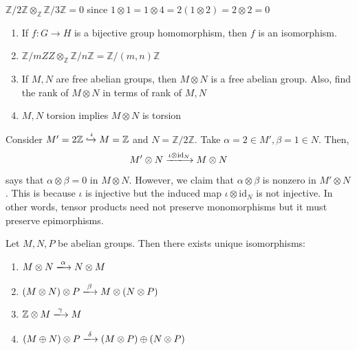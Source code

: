 \documentclass[oneside, 12pt]{scrbook}
\newcommand{\ZZ}{\mathbb Z}
\theoremstyle{theorem}
\begin{document}
\begin{example}
$\ZZ/2\ZZ \otimes_{\ZZ} \ZZ / 3\ZZ = 0$ since $1 \otimes 1 = 1 \otimes 4 = 2(1 \otimes 2) = 2 \otimes 2 = 0$
\end{example}

\begin{exercise}
\begin{enumerate}
\item If $f : G \rightarrow H$ is a bijective group homomorphism, then $f$ is an isomorphism. 

\item $\ZZ / m ZZ \otimes_{\ZZ} \ZZ / n \ZZ = \ZZ / (m,n) \ZZ$
\item If $M,N$ are free abelian groups, then $M \otimes N$ is a free abelian group. Also, find the rank of $M \otimes N$ in terms of rank of $M,N$
\item $M,N$ torsion implies $M \otimes N$ is torsion
\end{enumerate}
\end{exercise}

\begin{example}
Consider $M' = 2\ZZ \xhookrightarrow{\iota} M  =\ZZ$ and $N = \ZZ / 2 \ZZ$. Take $\alpha = 2 \in M' , \beta = 1 \in N$. Then,
\begin{equation}
M' \otimes N \xlongrightarrow{\iota \otimes \mathrm{id}_{N}} M \otimes N
\end{equation} 
says that $\alpha \otimes \beta =0$ in $M \otimes N$. However, we claim that $\alpha \otimes \beta $ is nonzero in $M' \otimes N$. This is because $\iota$ is injective but the induced map $\iota \otimes \mathrm{id}_{N}$ is not injective. In other words, tensor products need not preserve monomorphisms but it must preserve epimorphisms.
\end{example}

\begin{theorem}
Let $M,N,P$ be abelian groups. Then there exists unique isomorphisms: 
\begin{enumerate}
\item $M \otimes N \xlongrightarrow{\alpha} N \otimes M$
\item $(M \otimes N)\otimes P \xlongrightarrow{\beta} M \otimes (N \otimes P)$
\item $\ZZ\otimes M \xlongrightarrow{\gamma} M $
\item $(M \oplus N) \otimes P \xlongrightarrow{\delta} (M \otimes P) \oplus (N \otimes P)$
\end{enumerate}
\end{theorem}
\end{document}

